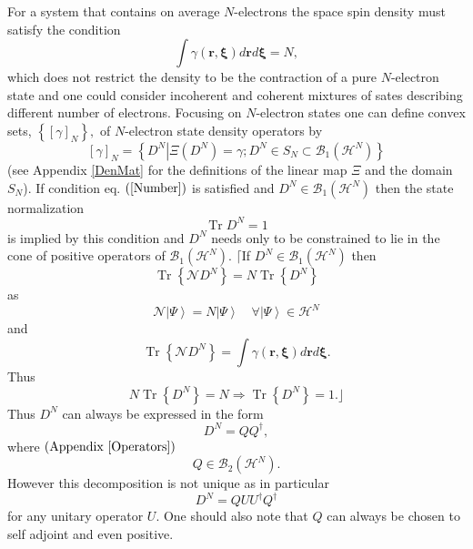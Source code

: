 \documentclass[aps,preprint]{revtex4}%
\begin{document}
For a system that contains on average $N$-electrons the space spin density
must satisfy the condition
\begin{equation}
\int\gamma\left(  \mathbf{r,\xi}\right)  d\mathbf{r}d\mathbf{\xi
}=N,\label{Number}%
\end{equation}
which does not restrict the density to be the contraction of a pure
$N$-electron state and one could consider incoherent and coherent mixtures of
sates describing different number of electrons. Focusing on $N$-electron
states one can define convex sets, $\left\{  \left[  \gamma\right]
_{N}\right\}  ,$ of $N$-electron state density operators by
\begin{equation}
\left[  \gamma\right]  _{N}=\left\{  \left.  D^{N}\right\vert \Xi\left(
D^{N}\right)  =\gamma;D^{N}\in S_{N}\subset\mathcal{B}_{1}\left(
\mathcal{H}^{N}\right)  \right\}
\end{equation}
(see Appendix \ref{DenMat} for the definitions of the linear map $\Xi$ and the
domain $S_{N}$). If condition eq. $\left(  \ref{Number}\right)  $ is satisfied
and $D^{N}\in\mathcal{B}_{1}\left(  \mathcal{H}^{N}\right)  $ then the state
normalization
\begin{equation}
\operatorname{Tr}D^{N}=1
\end{equation}
is implied by this condition and $D^{N}$ needs only to be constrained to lie
in the cone of positive operat$_{{}}$ors of $\mathcal{B}_{1}\left(
\mathcal{H}^{N}\right)  $. $\lceil$If $D^{N}\in\mathcal{B}_{1}\left(
\mathcal{H}^{N}\right)  $ then
\begin{equation}
\operatorname{Tr}\left\{  \mathcal{N}D^{N}\right\}  =N\operatorname{Tr}%
\left\{  D^{N}\right\}
\end{equation}
as
\begin{equation}
\mathcal{N}\left\vert \Psi\right\rangle =N\left\vert \Psi\right\rangle
\quad\forall\left\vert \Psi\right\rangle \in\mathcal{H}^{N}%
\end{equation}
and
\begin{equation}
\operatorname{Tr}\left\{  \mathcal{N}D^{N}\right\}  =\int\gamma\left(
\mathbf{r,\xi}\right)  d\mathbf{r}d\mathbf{\xi.}%
\end{equation}
Thus
\begin{equation}
N\operatorname{Tr}\left\{  D^{N}\right\}  =N\Rightarrow\operatorname{Tr}%
\left\{  D^{N}\right\}  =1.\rfloor
\end{equation}
Thus $D^{N}$ can always be expressed in the form
\begin{equation}
D^{N}=QQ^{\dagger},
\end{equation}
where $\left(  \text{Appendix \ref{Operators}}\right)  $
\begin{equation}
Q\in\mathcal{B}_{2}\left(  \mathcal{H}^{N}\right)  .
\end{equation}
However this decomposition is not unique as in particular
\begin{equation}
D^{N}=QUU^{\dagger}Q^{\dagger}%
\end{equation}
for any unitary operator $U$. One should also note that $Q$ can always be
chosen to self adjoint and even positive.
\end{document}
